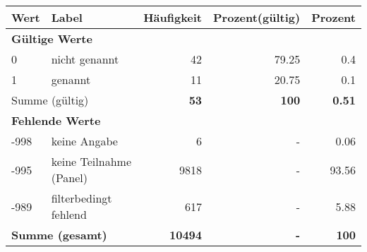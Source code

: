      \begin{longtable}{lXrrr}
     \toprule
     \textbf{Wert} & \textbf{Label} & \textbf{Häufigkeit} & \textbf{Prozent(gültig)} & \textbf{Prozent} \\
     \endhead
     \midrule
     \multicolumn{5}{l}{\textbf{Gültige Werte}}\\

     0 &
     \multicolumn{1}{X}{ nicht genannt   } &


       \num{42} &
       \num[round-mode=places,round-precision=2]{79,25} &
         \num[round-mode=places,round-precision=2]{0,4} \\

     1 &
     \multicolumn{1}{X}{ genannt   } &


       \num{11} &
       \num[round-mode=places,round-precision=2]{20,75} &
         \num[round-mode=places,round-precision=2]{0,1} \\
     \midrule
     \multicolumn{2}{l}{Summe (gültig)} &
       \textbf{\num{53}} &
     \textbf{100} &
       \textbf{\num[round-mode=places,round-precision=2]{0,51}} \\
     \multicolumn{5}{l}{\textbf{Fehlende Werte}}\\
       -998 &
       keine Angabe &
         \num{6} &
        - &
         \num[round-mode=places,round-precision=2]{0,06} \\
       -995 &
       keine Teilnahme (Panel) &
         \num{9818} &
        - &
         \num[round-mode=places,round-precision=2]{93,56} \\
       -989 &
       filterbedingt fehlend &
         \num{617} &
        - &
         \num[round-mode=places,round-precision=2]{5,88} \\
     \midrule
     \multicolumn{2}{l}{\textbf{Summe (gesamt)}} &
          \textbf{\num{10494}} &
        \textbf{-} &
        \textbf{100} \\
     \bottomrule
     \end{longtable}
     
